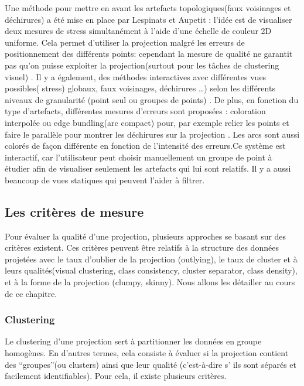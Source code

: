Une méthode pour mettre en avant les artefacts topologiques(faux voisinages et déchirures) a été mise en place par Lespinats et Aupetit \cite{CheckViz} : l’idée est de visualiser deux mesures de stress simultanément à l’aide d’une échelle de couleur 2D uniforme. 
Cela permet d’utiliser la projection malgré les erreurs de positionnement des différents points: cependant la mesure de qualité ne garantit pas qu’on puisse exploiter la projection(surtout pour les tâches de clustering visuel) .
\newline
Il y a également, des méthodes interactives avec différentes vues
possibles( stress) globaux, faux voisinages, déchirures …) selon les différents niveaux de
granularité (point seul ou groupes de points) \cite{abbas2019clustme} \cite{HeulotThese}. De plus, en fonction du type d’artefacts,
différentes mesures d’erreurs sont proposées : coloration interpolée ou edge bundling(arc
compact) pour, par exemple relier les points et faire le parallèle pour montrer les déchirures
sur la projection \cite{holten2006-EDGE1} \cite{holten2011-EDGE2} \cite{HeulotThese}. Les arcs sont aussi colorés de façon différente en fonction de l’intensité
des erreurs.\newline Ce système est interactif, car l’utilisateur peut choisir manuellement un groupe de point à
étudier afin de visualiser seulement les artefacts qui lui sont relatifs. Il y a aussi beaucoup de
vues statiques qui peuvent l’aider à filtrer.

\subsection{Les critères de mesure}

Pour évaluer la qualité d’une projection, plusieurs approches se basant sur des critères existent.
Ces critères peuvent être relatifs à la structure des données projetées avec le taux d’oublier de la projection (outlying), le taux de cluster et à leurs qualités(visual clustering, class consistency, cluster separator, class density), et à la forme de la projection (clumpy, skinny).
Nous allons les détailler au cours de ce chapitre.

\subsubsection{Clustering}
Le clustering d’une projection sert à partitionner les données en groupe homogènes. En d’autres termes, cela consiste à évaluer si la projection contient des “groupes”(ou clusters) ainsi que leur qualité (c'est-à-dire s’ ils sont séparés et facilement identifiables).
Pour cela, il existe plusieurs critères.

